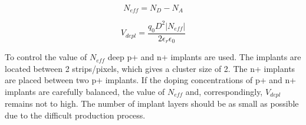 \begin{equation}
 N_{eff}=N_{D}-N_{A}
\end{equation}

\begin{equation}
 V_{depl}=\frac{q_0 D^2 |N_{eff}|}{2 \epsilon_r \epsilon_0 }
\end{equation}

To control the value of $N_{eff}$ deep p+ and n+ implants are used. 
The implants are located between 2 strips/pixels, which gives a cluster size of 2. 
The n+ implants are placed between two p+ implants. 
If the doping concentrations of p+ and n+ implants are carefully balanced, the value of $N_{eff}$ and, correspondingly, $V_{depl}$ remains not to high. 
The number of implant layers should be as small as possible due to the difficult production process. 
